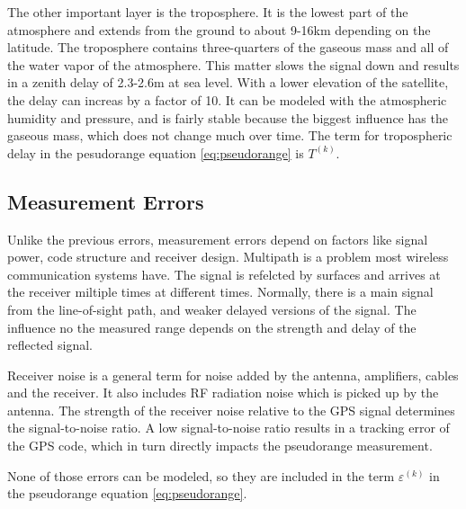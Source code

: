The other important layer is the troposphere.
It is the lowest part of the atmosphere and extends from the ground to about 9-16km depending on the latitude.
The troposphere contains three-quarters of the gaseous mass and all of the water vapor of the atmosphere.
This matter slows the signal down and results in a zenith delay of 2.3-2.6m at sea level.
With a lower elevation of the satellite, the delay can increas by a factor of 10.
It can be modeled with the atmospheric humidity and pressure, and is fairly stable because the biggest influence has the gaseous mass, which does not change much over time.
The term for tropospheric delay in the pesudorange equation \ref{eq:pseudorange} is $T^{(k)}$.

\subsection{Measurement Errors}

Unlike the previous errors, measurement errors depend on factors like signal power, code structure and receiver design.
Multipath is a problem most wireless communication systems have.
The signal is refelcted by surfaces and arrives at the receiver miltiple times at different times.
Normally, there is a main signal from the line-of-sight path, and weaker delayed versions of the signal.
The influence no the measured range depends on the strength and delay of the reflected signal.

Receiver noise is a general term for noise added by the antenna, amplifiers, cables and the receiver.
It also includes RF radiation noise which is picked up by the antenna.
The strength of the receiver noise relative to the GPS signal determines the signal-to-noise ratio.
A low signal-to-noise ratio results in a tracking error of the GPS code, which in turn directly impacts the pseudorange measurement.

None of those errors can be modeled, so they are included in the term $\varepsilon^{(k)}$ in the pseudorange equation \ref{eq:pseudorange}.

